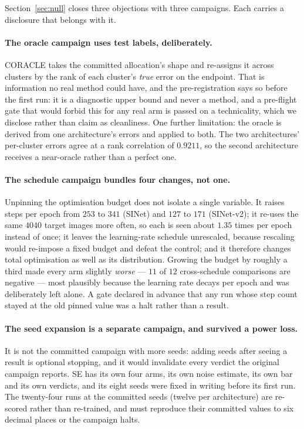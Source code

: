 \documentclass{article}
\begin{document}
Section~\ref{sec:null} closes three objections with three campaigns. Each carries a disclosure that
belongs with it.

\paragraph{The oracle campaign uses test labels, deliberately.} CORACLE takes the committed
allocation's shape and re-assigns it across clusters by the rank of each cluster's \emph{true} error
on the endpoint. That is information no real method could have, and the pre-registration says so
before the first run: it is a diagnostic upper bound and never a method, and a pre-flight gate that
would forbid this for any real arm is passed on a technicality, which we disclose rather than claim
as cleanliness. One further limitation: the oracle is derived from one architecture's errors and
applied to both. The two architectures' per-cluster errors agree at a rank correlation of $0.9211$,
so the second architecture receives a near-oracle rather than a perfect one.

\paragraph{The schedule campaign bundles four changes, not one.} Unpinning the optimisation budget
does not isolate a single variable. It raises steps per epoch from $253$ to $341$ (SINet) and $127$
to $171$ (SINet-v2); it re-uses the same $4040$ target images more often, so each is seen about
$1.35$ times per epoch instead of once; it leaves the learning-rate schedule unrescaled, because
rescaling would re-impose a fixed budget and defeat the control; and it therefore changes total
optimisation as well as its distribution. Growing the budget by roughly a third made every arm
slightly \emph{worse} --- $11$ of $12$ cross-schedule comparisons are negative --- most plausibly
because the learning rate decays per epoch and was deliberately left alone. A gate declared in
advance that any run whose step count stayed at the old pinned value was a halt rather than a
result.

\paragraph{The seed expansion is a separate campaign, and survived a power loss.} It is not the
committed campaign with more seeds: adding seeds after seeing a result is optional stopping, and it
would invalidate every verdict the original campaign reports. SE has its own four arms, its own
noise estimate, its own bar and its own verdicts, and its eight seeds were fixed in writing before
its first run. The twenty-four runs at the committed seeds (twelve per architecture) are re-scored
rather than re-trained, and must
reproduce their committed values to six decimal places or the campaign halts.
\end{document}
